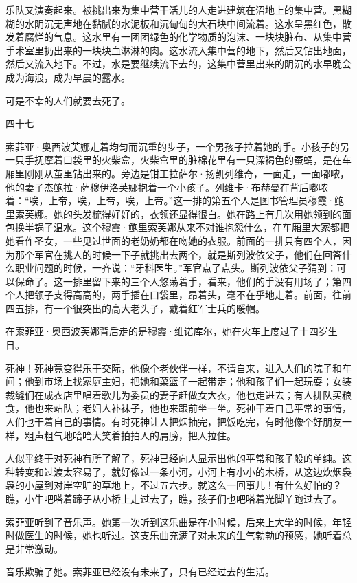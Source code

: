 乐队又演奏起来。被挑出来为集中营干活儿的人走进建筑在沼地上的集中营。黑糊糊的水阴沉无声地在黏腻的水泥板和沉甸甸的大石块中间流着。这水呈黑红色，散发着腐烂的气息。这水里有一团团绿色的化学物质的泡沫、一块块脏布、从集中营手术室里扔出来的一块块血淋淋的肉。这水流入集中营的地下，然后又钻出地面，然后又流入地下。不过，水是要继续流下去的，这集中营里出来的阴沉的水早晚会成为海浪，成为早晨的露水。

可是不幸的人们就要去死了。

四十七

索菲亚·奥西波芙娜走着均匀而沉重的步子，一个男孩子拉着她的手。小孩子的另一只手抚摩着口袋里的火柴盒，火柴盒里的脏棉花里有一只深褐色的蚕蛹，是在车厢里刚刚从茧里钻出来的。旁边是钳工拉萨尔·扬凯列维奇，一面走，一面嘟哝，他的妻子杰鲍拉·萨穆伊洛芙娜抱着一个小孩子。列维卡·布赫曼在背后嘟哝着：“唉，上帝，唉，上帝，唉，上帝。”这一排的第五个人是图书管理员穆霞·鲍里索芙娜。她的头发梳得好好的，衣领还显得很白。她在路上有几次用她领到的面包换半锅子温水。这个穆霞·鲍里索芙娜从来不对谁抱怨什么，在车厢里大家都把她看作圣女，一些见过世面的老奶奶都在吻她的衣服。前面的一排只有四个人，因为那个军官在挑人的时候一下子就挑出去两个，就是斯列波依父子，他们在回答什么职业问题的时候，一齐说：“牙科医生。”军官点了点头。斯列波依父子猜到：可以保命了。这一排里留下来的三个人悠荡着手，看来，他们的手没有用场了；第四个人把领子支得高高的，两手插在口袋里，昂着头，毫不在乎地走着。前面，往前四五排，有一个很突出的高大老头子，戴着红军士兵的暖帽。

在索菲亚·奥西波芙娜背后走的是穆霞·维诺库尔，她在火车上度过了十四岁生日。

死神！死神竟变得乐于交际，他像个老伙伴一样，不请自来，进入人们的院子和车间；他到市场上找家庭主妇，把她和菜篮子一起带走；他和孩子们一起玩耍；女装裁缝们在成衣店里唱着歌儿为委员的妻子赶做女大衣，他也走进去；有人排队买粮食，他也来站队；老妇人补袜子，他也来跟前坐一坐。死神干着自己平常的事情，人们也干着自己的事情。有时死神让人把烟抽完，把饭吃完，有时他像个好朋友一样，粗声粗气地哈哈大笑着拍拍人的肩膀，把人拉住。

人似乎终于对死神有所了解了，死神已经向人显示出他的平常和孩子般的单纯。这种转变和过渡太容易了，就好像过一条小河，小河上有小小的木桥，从这边炊烟袅袅的小屋到对岸空旷的草地上，不过五六步。就这么一回事儿！有什么好怕的？瞧，小牛吧嗒着蹄子从小桥上走过去了，瞧，孩子们也吧嗒着光脚丫跑过去了。

索菲亚听到了音乐声。她第一次听到这乐曲是在小时候，后来上大学的时候，年轻时做医生的时候，她也听过。这支乐曲充满了对未来的生气勃勃的预感，她听着总是非常激动。

音乐欺骗了她。索菲亚已经没有未来了，只有已经过去的生活。


